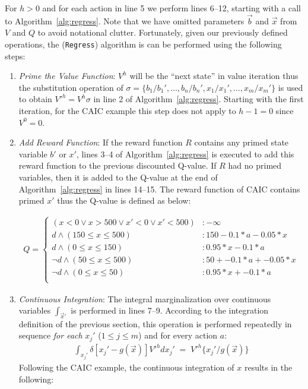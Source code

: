 \documentclass[twoside,11pt]{article}
\begin{document}
For $h > 0$ and for each action in line 5 we perform lines 6--12, starting with a call to Algorithm~\ref{alg:regress}.  Note that we have omitted parameters $\vec{b}$ and
$\vec{x}$ from $V$ and $Q$ to avoid notational clutter.
Fortunately, given our previously defined
operations, the (\texttt{Regress}) algorithm is can be performed using the following steps: 
\begin{enumerate}
\item {\it Prime the Value Function}: $V^{h}$ will be
the ``next state'' in value iteration thus the substitution operation of 
$\sigma = \{ b_1 / b_1', \ldots, b_n / b_n', x_1 / x_1', \ldots, x_m / x_m' \}$ is used to obtain
$V'^{h} = V^{h}\sigma$ in line 2 of Algorithm~\ref{alg:regress}. Starting with the first iteration, for the \textsc{CAIC} example this step does not apply to $h-1=0$ since $V^0=0$.

\item {\it Add Reward Function}: If the reward function $R$ contains any primed state variable $b'$ or $x'$, lines 3--4 of Algorithm~\ref{alg:regress} is executed to add this reward function to the previous discounted Q-value. If $R$ had no primed variables, then it is added to the Q-value at the end of Algorithm~\ref{alg:regress} in lines 14--15. The reward function of \textsc{CAIC} contains primed $x'$ thus the Q-value is defined as below: 

{%
\begin{align}
Q = \begin{cases}
(x < 0 \vee x>500 \vee x'<0 \vee x'<500) &: -\infty \\
d \land (150 \leq x \leq 500) &:  150 - 0.1 * a - 0.05 * x \\
d \land (0 \leq x \leq 150) &:  0.95 * x - 0.1 * a \\
\neg d \land (50 \leq x \leq 500) &: 50 + -0.1 * a+ -0.05 * x \\
\neg d \land (0 \leq x \leq 50) &:  0.95 * x + -0.1 * a\\
\end{cases} \nonumber
\end{align}}
\item {\it Continuous Integration}: The integral
marginalization over continuous variables $\int_{\vec{x}'}$ is performed in lines 7--9. According to the integration definition of the previous section,  this operation is performed repeatedly in sequence \emph{for each}
$x_j'$ ($1 \leq j \leq m$) and for every action $a$: 
\begin{align*}
\int_{x_j'} \delta[x_j' - g(\vec{x})] V'^{h} dx_j' \; = \; V'^{h} \{x_j' / g(\vec{x}) \}  
\end{align*} 
Following the \textsc{CAIC} example, the continuous integration of $x$ results in the following: 


\end{enumerate}
\end{document}
